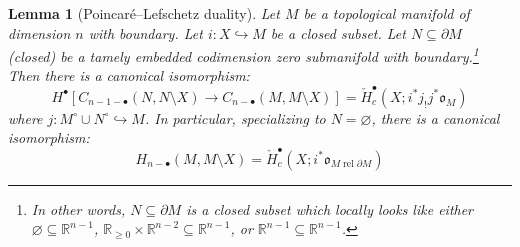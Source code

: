 \documentclass[12pt]{article}
\newtheorem{lemma}[theorem]{Lemma}
\theoremstyle{definition}
\theoremstyle{remark}
\numberwithin{equation}{subsection}
\newcommand{\oo}{\mathfrak o}
\newcommand{\RR}{\mathbb R}
\newcommand{\cH}{\check H}
\newcommand{\rel}{\operatorname{rel}}
\begin{document}
\begin{lemma}[Poincar\'e--Lefschetz duality]\label{poincareduality}
Let $M$ be a topological manifold of dimension $n$ with boundary.  Let $i:X\hookrightarrow M$ be a closed subset.  Let $N\subseteq\partial M$ (closed) be a tamely embedded codimension zero submanifold with boundary.\footnote{In other words, $N\subseteq\partial M$ is a closed subset which locally looks like either $\varnothing\subseteq\RR^{n-1}$, $\RR_{\geq 0}\times\RR^{n-2}\subseteq\RR^{n-1}$, or $\RR^{n-1}\subseteq\RR^{n-1}$.}  Then there is a canonical isomorphism:
\begin{equation}\label{poincaredualitygoal}
H^\bullet[C_{n-1-\bullet}(N,N\setminus X)\to C_{n-\bullet}(M,M\setminus X)]=\cH^\bullet_c(X;i^\ast j_!j^\ast\oo_M)
\end{equation}
where $j:M^\circ\cup N^\circ\hookrightarrow M$.  In particular, specializing to $N=\varnothing$, there is a canonical isomorphism:
\begin{equation}
H_{n-\bullet}(M,M\setminus X)=\cH^\bullet_c(X;i^\ast\oo_{M\rel\partial M})
\end{equation}
\end{lemma}
\end{document}
